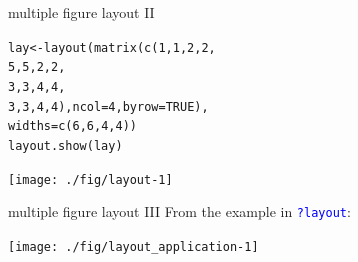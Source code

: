 \documentclass[xcolor=table,       handout,    xcolor=dvipsnames]{beamer}\usepackage[]{graphicx}\usepackage[]{color}
\makeatletter
\newcommand{\hlnum}[1]{\textcolor[rgb]{0,0,0}{#1}}
\newcommand{\hlstd}[1]{\textcolor[rgb]{0,0,0}{#1}}
\newcommand{\hlkwb}[1]{\textcolor[rgb]{0,0,0}{#1}}
\newcommand{\hlkwc}[1]{\textcolor[rgb]{1,0,1}{#1}}
\newcommand{\hlkwd}[1]{\textcolor[rgb]{0,0,1}{#1}}
\newenvironment{kframe}{%
 \def\at@end@of@kframe{}%
 \ifinner\ifhmode%
  \def\at@end@of@kframe{\end{minipage}}%
  \begin{minipage}{\columnwidth}%
 \fi\fi%
 \def\FrameCommand##1{\hskip\@totalleftmargin \hskip-\fboxsep
 \colorbox{shadecolor}{##1}\hskip-\fboxsep
     \hskip-\linewidth \hskip-\@totalleftmargin \hskip\columnwidth}%
 \MakeFramed {\advance\hsize-\width
   \@totalleftmargin\z@ \linewidth\hsize
   \@setminipage}}%
 {\par\unskip\endMakeFramed%
 \at@end@of@kframe}
\newenvironment{knitrout}{}{} %
\newcommand{\rcode}[1]{\texttt{\textcolor{Blue}{#1}}} %
\makeatother
\begin{document}

\begin{frame}[fragile]{multiple figure layout II}
\vspace{-1.5em}
\begin{knitrout}\footnotesize
{}\color{fgcolor}\begin{kframe}
\begin{alltt}
\hlstd{lay} \hlkwb{<-} \hlkwd{layout}\hlstd{(}\hlkwd{matrix}\hlstd{(}\hlkwd{c}\hlstd{(}\hlnum{1}\hlstd{,}\hlnum{1}\hlstd{,}\hlnum{2}\hlstd{,}\hlnum{2}\hlstd{,}
                       \hlnum{5}\hlstd{,}\hlnum{5}\hlstd{,}\hlnum{2}\hlstd{,}\hlnum{2}\hlstd{,}
                       \hlnum{3}\hlstd{,}\hlnum{3}\hlstd{,}\hlnum{4}\hlstd{,}\hlnum{4}\hlstd{,}
                       \hlnum{3}\hlstd{,}\hlnum{3}\hlstd{,}\hlnum{4}\hlstd{,}\hlnum{4}\hlstd{),} \hlkwc{ncol}\hlstd{=}\hlnum{4}\hlstd{,} \hlkwc{byrow}\hlstd{=}\hlnum{TRUE}\hlstd{),}
              \hlkwc{widths}\hlstd{=}\hlkwd{c}\hlstd{(}\hlnum{6}\hlstd{,}\hlnum{6}\hlstd{,}\hlnum{4}\hlstd{,}\hlnum{4}\hlstd{))}
\hlkwd{layout.show}\hlstd{(lay)}
\end{alltt}
\end{kframe}

{\centering \texttt{[image: ./fig/layout-1]} 

}



\end{knitrout}
\end{frame}


\begin{frame}[fragile]{multiple figure layout III}
From the example in \rcode{?layout}:\\
\vspace{-1em}
\begin{knitrout}
\color{fgcolor}

{\centering \texttt{[image: ./fig/layout\_application-1]} 

}



\end{knitrout}
\end{frame}



\end{document}

